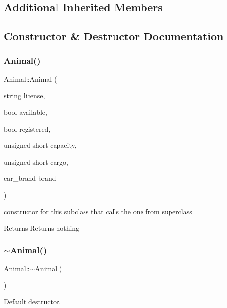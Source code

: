 \subsection*{Additional Inherited Members}


\subsection{Constructor \& Destructor Documentation}
\mbox{\label{class_animal_a6718d601daac5572ce4d64e0cc712c01}} 
\subsubsection{\texorpdfstring{Animal()}{Animal()}}
{\footnotesize\ttfamily Animal\+::\+Animal (\begin{DoxyParamCaption}\item[{string}]{license,  }\item[{bool}]{available,  }\item[{bool}]{registered,  }\item[{unsigned short}]{capacity,  }\item[{unsigned short}]{cargo,  }\item[{car\+\_\+brand}]{brand }\end{DoxyParamCaption})}



constructor for this subclass that calls the one from superclass 

\begin{DoxyReturn}{Returns}
Returns nothing 
\end{DoxyReturn}
\mbox{\label{class_animal_a476af25adde5f0dfa688129c8f86fa5c}} 
\subsubsection{\texorpdfstring{$\sim$\+Animal()}{~Animal()}}
{\footnotesize\ttfamily Animal\+::$\sim$\+Animal (\begin{DoxyParamCaption}{ }\end{DoxyParamCaption})\hspace{0.3cm}{\ttfamily [inline]}}



Default destructor. 

